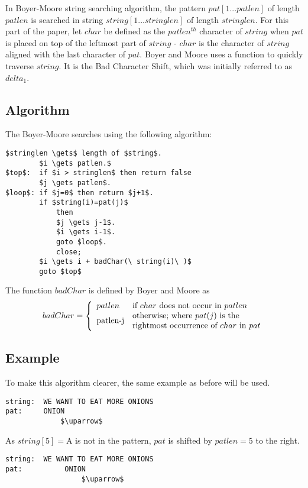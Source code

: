In Boyer-Moore string searching algorithm, the pattern $pat[1 ... patlen]$ of length $patlen$ is searched in string $string[1 ... stringlen]$ of length $stringlen$. For this part of the paper, let $char$ be defined as the $patlen^{th}$ character of $string$ when $pat$ is placed on top of the leftmost part of $string$ - $char$ is the character of $string$ aligned with the last character of $pat$. Boyer and Moore uses a function to quickly traverse $string$. It is the Bad Character Shift, which was initially referred to as $delta_1$.\cite{boyerMoore}

\subsection{Algorithm}
The Boyer-Moore searches using the following algorithm:
\begin{lstlisting}[mathescape=true]
		$stringlen \gets$ length of $string$.
		$i \gets patlen.$
$top$:	if $i > stringlen$ then return false
		$j \gets patlen$.
$loop$:	if $j=0$ then return $j+1$.
		if $string(i)=pat(j)$
			then
			$j \gets j-1$.
			$i \gets i-1$.
			goto $loop$.
			close;
		$i \gets i + badChar(\ string(i)\ )$
		goto $top$
\end{lstlisting}

The function $badChar$ is defined by Boyer and Moore as $$badChar = \left\{ \begin{array}{l l} patlen & \textrm{if } char \textrm{ does not occur in } patlen \\ \multirow{2}{*}{patlen-j} & \textrm{otherwise; where } pat(j) \textrm{ is the}\\  &  \textrm{rightmost occurrence of } char \textrm{ in } pat \end{array}\right.$$

\subsection{Example}
To make this algorithm clearer, the same example as before will be used.
\begin{lstlisting}[mathescape=true, basicstyle=\LSTfont]
string:  WE WANT TO EAT MORE ONIONS
pat:     ONION
             $\uparrow$
\end{lstlisting}

As $string[5]=$A is not in the pattern, $pat$ is shifted by $patlen=5$ to the right.

\begin{lstlisting}[mathescape=true, basicstyle=\LSTfont]
string:  WE WANT TO EAT MORE ONIONS
pat:          ONION
                  $\uparrow$
\end{lstlisting}

